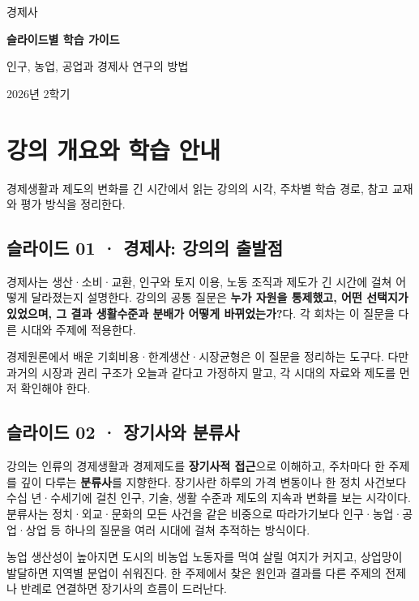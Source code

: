 \documentclass[10pt,a4paper]{article}
\begin{document}
\begin{titlepage}\centering\vspace*{3cm}
{\Large 경제사\par}\vspace{1.1cm}
{\Huge\bfseries 슬라이드별 학습 가이드\par}\vspace{1.1cm}
{\large 인구, 농업, 공업과 경제사 연구의 방법\par}
\vfill {\large 2026년 2학기\par}\end{titlepage}
\tableofcontents\clearpage

\section{강의 개요와 학습 안내}
경제생활과 제도의 변화를 긴 시간에서 읽는 강의의 시각, 주차별 학습 경로, 참고 교재와 평가 방식을 정리한다.\par

\subsection{슬라이드 01 · 경제사: 강의의 출발점}
경제사는 생산·소비·교환, 인구와 토지 이용, 노동 조직과 제도가 긴 시간에 걸쳐 어떻게 달라졌는지 설명한다. 강의의 공통 질문은 \textbf{누가 자원을 통제했고, 어떤 선택지가 있었으며, 그 결과 생활수준과 분배가 어떻게 바뀌었는가?}다. 각 회차는 이 질문을 다른 시대와 주제에 적용한다.\par

경제원론에서 배운 기회비용·한계생산·시장균형은 이 질문을 정리하는 도구다. 다만 과거의 시장과 권리 구조가 오늘과 같다고 가정하지 말고, 각 시대의 자료와 제도를 먼저 확인해야 한다.\par

\subsection{슬라이드 02 · 장기사와 분류사}
강의는 인류의 경제생활과 경제제도를 \textbf{장기사적 접근}으로 이해하고, 주차마다 한 주제를 깊이 다루는 \textbf{분류사}를 지향한다. 장기사란 하루의 가격 변동이나 한 정치 사건보다 수십 년·수세기에 걸친 인구, 기술, 생활 수준과 제도의 지속과 변화를 보는 시각이다. 분류사는 정치·외교·문화의 모든 사건을 같은 비중으로 따라가기보다 인구·농업·공업·상업 등 하나의 질문을 여러 시대에 걸쳐 추적하는 방식이다.\par

농업 생산성이 높아지면 도시의 비농업 노동자를 먹여 살릴 여지가 커지고, 상업망이 발달하면 지역별 분업이 쉬워진다. 한 주제에서 찾은 원인과 결과를 다른 주제의 전제나 반례로 연결하면 장기사의 흐름이 드러난다.\par
\end{document}
